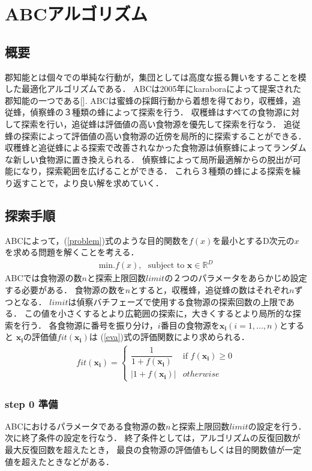 \section{ABCアルゴリズム}
\subsection{概要}
郡知能とは個々での単純な行動が，集団としては高度な振る舞いをすることを模した最適化アルゴリズムである．
ABCは2005年にkaraboraによって提案された郡知能の一つである[\cite{abc}].
ABCは蜜蜂の採餌行動から着想を得ており，収穫蜂，追従蜂，偵察蜂の３種類の蜂によって探索を行う．
収穫蜂はすべての食物源に対して探索を行い，追従蜂は評価値の高い食物源を優先して探索を行なう．
追従蜂の探索によって評価値の高い食物源の近傍を局所的に探索することができる．
収穫蜂と追従蜂による探索で改善されなかった食物源は偵察蜂によってランダムな新しい食物源に置き換えられる．
偵察蜂によって局所最適解からの脱出が可能になり，探索範囲を広げることができる．
これら３種類の蜂による探索を繰り返すことで，より良い解を求めていく．
\subsection{探索手順}
ABCによって，(\ref{problem})式のような目的関数を$f(x)$を最小とするD次元の$x$を求める問題を解くことを考える．
\begin{align}
    \label{problem}
\text{min}.f(x), \text{~~subject to } \boldsymbol{x} \in \mathbb{R} ^D
\end{align}
ABCでは食物源の数$n$と探索上限回数$limit$の２つのパラメータをあらかじめ設定する必要がある．
食物源の数を$n$とすると，収穫蜂，追従蜂の数はそれぞれ$n$ずつとなる．
$limit$は偵察バチフェーズで使用する食物源の探索回数の上限である．
この値を小さくするとより広範囲の探索に，大きくするとより局所的な探索を行う．
各食物源に番号を振り分け，$i$番目の食物源を$\boldsymbol{x_{i}}(i = 1,...,n)$とすると
$\boldsymbol{x_{i}}$の評価値$fit(\boldsymbol{x_{i}})$は
(\ref{eva})式の評価関数により求められる．
\begin{align}
    \label{eva} 
    fit(\boldsymbol{x_{i}}) =
    \begin{cases}
    \dfrac{1}{1+f(\boldsymbol{x_{i}})} & \text{if } f(\boldsymbol{x_{i}}) \geq 0   \\
    \left\lvert1+f(\boldsymbol{x_{i}})\right\rvert & otherwise
    \end{cases}
\end{align}
\subsubsection*{step 0 準備}
ABCにおけるパラメータである食物源の数$n$と探索上限回数$limit$の設定を行う．次に終了条件の設定を行なう．
終了条件としては，アルゴリズムの反復回数が最大反復回数を超えたとき，
最良の食物源の評価値もしくは目的関数値が一定値を超えたときなどがある．

